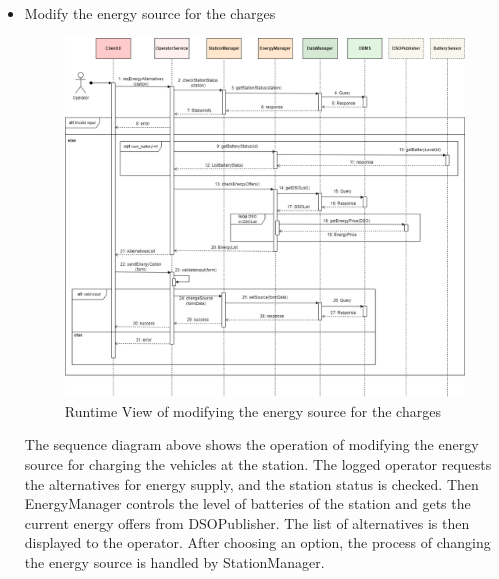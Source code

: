 \documentclass[../main.tex]{subfiles}
\begin{document}
\begin{itemize}
    \newpage
    \item Modify the energy source for the charges
    {
    \begin{figure}[H]
    \centering
    \includegraphics[width=\textwidth]{runtimeview/op_source.png}
    \caption{Runtime View of modifying the energy source for the charges}
    \label{fig:op_source}
    \end{figure}}
    The sequence diagram above shows the operation of modifying the energy source for charging the vehicles at the station. The logged operator requests the alternatives for energy supply, and the station status is checked. Then EnergyManager controls the level of batteries of the station and gets the current energy offers from DSOPublisher. The list of alternatives is then displayed to the operator. After choosing an option, the process of changing the energy source is handled by StationManager.
    
    
\end{itemize}


\newpage
\end{document}
